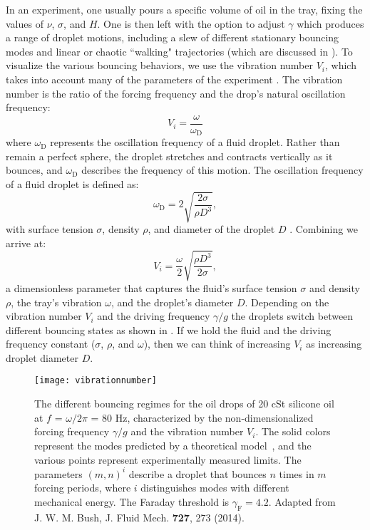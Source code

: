 In an experiment, one usually pours a specific volume of oil in the tray, fixing the values of $\nu$, $\sigma$, and $H$. One is then left with the option to adjust $\gamma$ which produces a range of droplet motions, including a slew of different stationary bouncing modes and linear or chaotic ``walking" trajectories (which are discussed in ). To visualize the various bouncing behaviors, we use the vibration number $V_i$, which takes into account many of the parameters of the experiment . The vibration number is the ratio of the forcing frequency and the drop's natural oscillation frequency:
\begin{equation} \label{vibrationnumber1}
V_i = \frac{\omega}{\omega_\mathrm{D}}
\end{equation}   
where $\omega_\mathrm{D}$ represents the oscillation frequency of a fluid droplet. Rather than remain a perfect sphere, the droplet stretches and contracts vertically as it bounces, and $\omega_\mathrm{D}$ describes the frequency of this motion. The oscillation frequency of a fluid droplet is defined as:
\begin{equation} \label{oscillationfrequency}
\omega_\mathrm{D} = 2\sqrt{\frac{2\sigma}{\rho D^3}},
\end{equation}   
with surface tension $\sigma$, density $\rho$, and diameter of the droplet $D$ . Combining  we arrive at:
\begin{equation} \label{vibrationnumber2}
V_i = \frac{\omega}{2}\sqrt{\frac{\rho D^3}{2\sigma}},
\end{equation}   	       	       
a dimensionless parameter that captures the fluid's surface tension $\sigma$ and density $\rho$, the tray's vibration $\omega$, and the droplet's diameter $D$. Depending on the vibration number $V_i$ and the driving frequency $\gamma/g$ the droplets switch between different bouncing states as shown in . If we hold the fluid and the driving frequency constant ($\sigma$, $\rho$, and $\omega$), then we can think of increasing $V_i$ as increasing droplet diameter $D$. 
	    
	    \begin{figure}[h]
	       \centering
	    \texttt{[image: vibrationnumber]}
	     \caption{The different bouncing regimes for the oil drops of 20 cSt silicone oil at $f$ = $\omega / 2\pi$ = 80 Hz, characterized by the non-dimensionalized forcing frequency $\gamma/g$ and the vibration number $V_i$. The solid colors represent the  modes predicted by a theoretical model~, and the various points represent experimentally measured limits. The parameters $(m,n)^{i}$ describe a droplet that bounces $n$ times in $m$ forcing periods, where $i$ distinguishes modes with different mechanical energy. The Faraday threshold is $\gamma_\mathrm{F} = 4.2$. Adapted from J. W. M. Bush, J. Fluid Mech. \textbf{727}, 273 (2014).}
	 \label{regime}
	\end{figure}

